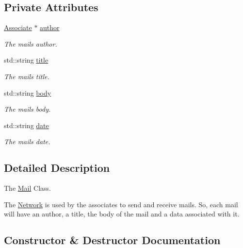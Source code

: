 \subsection*{Private Attributes}
\begin{DoxyCompactItemize}
\item 
\mbox{\hyperlink{classAssociate}{Associate}} $\ast$ \mbox{\hyperlink{classMail_acfe110a866f8cc54120d4f4ab0f8321b}{author}}
\begin{DoxyCompactList}\small\item\em The mail\textquotesingle{}s author. \end{DoxyCompactList}\item 
std\+::string \mbox{\hyperlink{classMail_a2f54f71a529dec6345d84ae60562b207}{title}}
\begin{DoxyCompactList}\small\item\em The mail\textquotesingle{}s title. \end{DoxyCompactList}\item 
std\+::string \mbox{\hyperlink{classMail_aaa91a94ee92b2712218a9cae389554f7}{body}}
\begin{DoxyCompactList}\small\item\em The mail\textquotesingle{}s body. \end{DoxyCompactList}\item 
std\+::string \mbox{\hyperlink{classMail_aee9bc87682f6173b92bf135397f38162}{date}}
\begin{DoxyCompactList}\small\item\em The mail\textquotesingle{}s date. \end{DoxyCompactList}\end{DoxyCompactItemize}


\subsection{Detailed Description}
The \mbox{\hyperlink{classMail}{Mail}} Class. 

The \mbox{\hyperlink{classNetwork}{Network}} is used by the associates to send and receive mails. So, each mail will have an author, a title, the body of the mail and a data associated with it. 

\subsection{Constructor \& Destructor Documentation}
\mbox{\label{classMail_acd3d916cd6a769cdaf6e91dbc2c85699}} 
